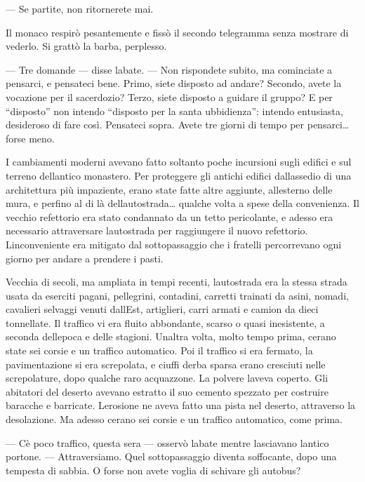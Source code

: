 --- Se partite, non ritornerete mai.

Il monaco respirò pesantemente e fissò il secondo telegramma senza
mostrare di vederlo. Si grattò la barba, perplesso.

--- Tre domande --- disse l\textquotesingle abate. --- Non rispondete
subito, ma cominciate a pensarci, e pensateci bene. Primo, siete
disposto ad andare? Secondo, avete la vocazione per il sacerdozio?
Terzo, siete disposto a guidare il gruppo? E per ``disposto'' non
intendo ``disposto per la santa ubbidienza'': intendo entusiasta,
desideroso di fare così. Pensateci sopra. Avete tre giorni di tempo per
pensarci\ldots{} forse meno.

I cambiamenti moderni avevano fatto soltanto poche incursioni sugli
edifici e sul terreno dell\textquotesingle antico monastero. Per
proteggere gli antichi edifici dall\textquotesingle assedio di una
architettura più impaziente, erano state fatte altre aggiunte,
all\textquotesingle esterno delle mura, e perfino al di là
dell\textquotesingle autostrada\ldots{} qualche volta a spese della
convenienza. Il vecchio refettorio era stato condannato da un tetto
pericolante, e adesso era necessario attraversare
l\textquotesingle autostrada per raggiungere il nuovo refettorio.
L\textquotesingle inconveniente era mitigato dal sottopassaggio che i
fratelli percorrevano ogni giorno per andare a prendere i pasti.

Vecchia di secoli, ma ampliata in tempi recenti,
l\textquotesingle autostrada era la stessa strada usata da eserciti
pagani, pellegrini, contadini, carretti trainati da asini, nomadi,
cavalieri selvaggi venuti dall\textquotesingle Est, artiglieri, carri
armati e camion da dieci tonnellate. Il traffico vi era fluito
abbondante, scarso o quasi inesistente, a seconda
dell\textquotesingle epoca e delle stagioni. Un\textquotesingle altra
volta, molto tempo prima, c\textquotesingle erano state sei corsie e un
traffico automatico. Poi il traffico si era fermato, la pavimentazione
si era screpolata, e ciuffi d\textquotesingle erba sparsa erano
cresciuti nelle screpolature, dopo qualche raro acquazzone. La polvere
l\textquotesingle aveva coperto. Gli abitatori del deserto avevano
estratto il suo cemento spezzato per costruire baracche e barricate.
L\textquotesingle erosione ne aveva fatto una pista nel deserto,
attraverso la desolazione. Ma adesso c\textquotesingle erano sei corsie
e un traffico automatico, come prima.

--- C\textquotesingle è poco traffico, questa sera --- osservò
l\textquotesingle abate mentre lasciavano l\textquotesingle antico
portone. --- Attraversiamo. Quel sottopassaggio diventa soffocante, dopo
una tempesta di sabbia. O forse non avete voglia di schivare gli
autobus?

